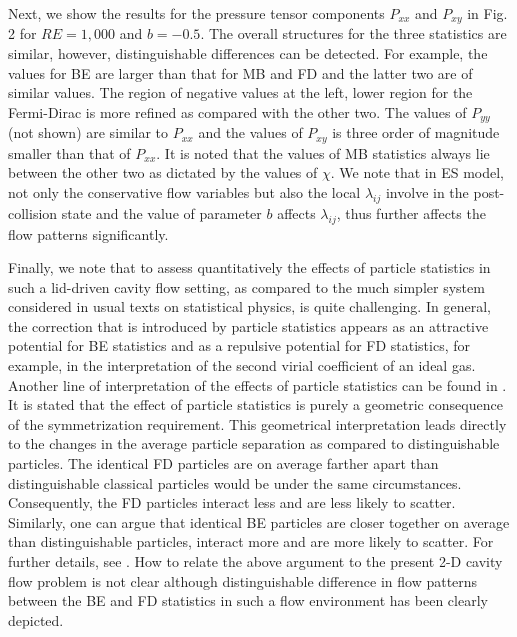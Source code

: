 \documentclass[doublecol]{epl2}
\begin{document}
Next, we show the results for the pressure tensor components $P_{xx}$ and $P_{xy}$ in Fig. 2 for $RE=1,000$ and $b=-0.5$.  The overall structures for the three statistics are similar, however, distinguishable differences can be detected.  For example, the values for BE are larger than that for MB and FD and the latter two are of similar values.  The region of negative values at the left, lower region for the Fermi-Dirac is more refined as compared with the other two.  The values of $P_{yy}$ (not shown) are similar to $P_{xx}$ and the values of $P_{xy}$ is three order of magnitude smaller than that of $P_{xx}$.  It is noted that the values of MB statistics always lie between the other two as dictated by the values of $\chi$.  We note that in ES model, not only the conservative flow variables but also the local $\lambda_{ij}$ involve in the post-collision state and the value of parameter $b$ affects $\lambda_{ij}$, thus further affects the flow patterns significantly.

Finally, we note that to assess quantitatively the effects of particle statistics in such a lid-driven cavity flow setting, as compared to the much simpler system considered in usual texts on statistical physics, is quite challenging. In general, the correction that is introduced by particle statistics appears as an attractive potential for BE statistics and as a repulsive potential for FD statistics, for example, in the interpretation of the second virial coefficient of an ideal gas. Another line of interpretation of the effects of particle statistics can be found in \cite{Mullin2003}.
It is stated that the effect of particle statistics is purely a geometric consequence of the symmetrization requirement. This geometrical interpretation leads directly to the changes in the average particle separation as compared to distinguishable particles. The identical FD particles are on average farther apart than distinguishable classical particles would be under the same circumstances. Consequently, the FD particles interact less and are less likely to scatter. Similarly, one can argue that identical BE particles are closer together on average than distinguishable particles, interact more and are more likely to scatter. For further details, see \cite{Mullin2003}. How to relate the above argument to the present 2-D cavity flow problem is not clear although distinguishable difference in flow patterns between the BE and FD statistics in such a flow environment has been clearly depicted.
\end{document}
